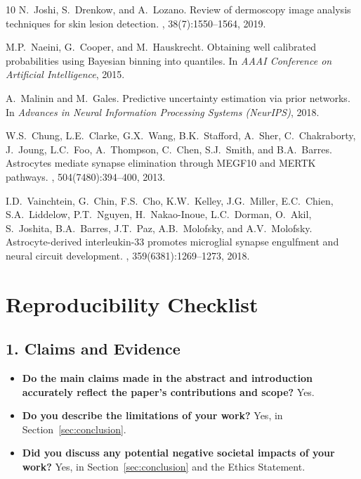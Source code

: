 \documentclass[11pt]{article}
\begin{document}
\begin{thebibliography}{10}
N.~Joshi, S.~Drenkow, and A.~Lozano.
\newblock Review of dermoscopy image analysis techniques for skin lesion detection.
, 38(7):1550--1564, 2019.

M.P.~Naeini, G.~Cooper, and M.~Hauskrecht.
\newblock Obtaining well calibrated probabilities using Bayesian binning into quantiles.
\newblock In {\em AAAI Conference on Artificial Intelligence}, 2015.

A.~Malinin and M.~Gales.
\newblock Predictive uncertainty estimation via prior networks.
\newblock In {\em Advances in Neural Information Processing Systems (NeurIPS)}, 2018.

W.S.~Chung, L.E.~Clarke, G.X.~Wang, B.K.~Stafford, A.~Sher, C.~Chakraborty, J.~Joung, L.C.~Foo, A.~Thompson, C.~Chen, S.J.~Smith, and B.A.~Barres.
\newblock Astrocytes mediate synapse elimination through MEGF10 and MERTK pathways.
, 504(7480):394--400, 2013.

I.D.~Vainchtein, G.~Chin, F.S.~Cho, K.W.~Kelley, J.G.~Miller, E.C.~Chien, S.A.~Liddelow, P.T.~Nguyen, H.~Nakao-Inoue, L.C.~Dorman, O.~Akil, S.~Joshita, B.A.~Barres, J.T.~Paz, A.B.~Molofsky, and A.V.~Molofsky.
\newblock Astrocyte-derived interleukin-33 promotes microglial synapse engulfment and neural circuit development.
, 359(6381):1269--1273, 2018.

\end{thebibliography}

\section*{Reproducibility Checklist}

\subsection*{1. Claims and Evidence}
\begin{itemize}
    \item \textbf{Do the main claims made in the abstract and introduction accurately reflect the paper's contributions and scope?} Yes.
    \item \textbf{Do you describe the limitations of your work?} Yes, in Section~\ref{sec:conclusion}.
    \item \textbf{Did you discuss any potential negative societal impacts of your work?} Yes, in Section~\ref{sec:conclusion} and the Ethics Statement.
\end{itemize}
\end{document}
